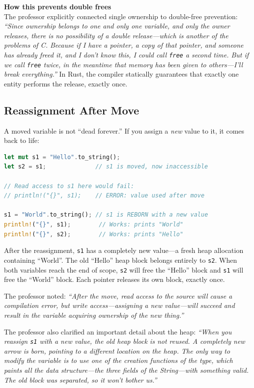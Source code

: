 \begin{insightbox}
\textbf{How this prevents double frees} \\
The professor explicitly connected single ownership to double-free prevention: \emph{``Since ownership belongs to one and only one variable, and only the owner releases, there is no possibility of a double release---which is another of the problems of C. Because if I have a pointer, a copy of that pointer, and someone has already freed it, and I don't know this, I could call \texttt{free} a second time. But if we call \texttt{free} twice, in the meantime that memory has been given to others---I'll break everything.''} In Rust, the compiler statically guarantees that exactly one entity performs the release, exactly once.
\end{insightbox}

\subsection{Reassignment After Move}

A moved variable is not ``dead forever.'' If you assign a \emph{new} value to it, it comes back to life:

\begin{lstlisting}[language=Rust]
let mut s1 = "Hello".to_string();
let s2 = s1;              // s1 is moved, now inaccessible

// Read access to s1 here would fail:
// println!("{}", s1);    // ERROR: value used after move

s1 = "World".to_string(); // s1 is REBORN with a new value
println!("{}", s1);        // Works: prints "World"
println!("{}", s2);        // Works: prints "Hello"
\end{lstlisting}

After the reassignment, \texttt{s1} has a completely new value---a fresh heap allocation containing ``World''. The old ``Hello'' heap block belongs entirely to \texttt{s2}. When both variables reach the end of scope, \texttt{s2} will free the ``Hello'' block and \texttt{s1} will free the ``World'' block. Each pointer releases its own block, exactly once.

The professor noted: \emph{``After the move, read access to the source will cause a compilation error, but write access---assigning a new value---will succeed and result in the variable acquiring ownership of the new thing.''}

The professor also clarified an important detail about the heap: \emph{``When you reassign \texttt{s1} with a new value, the old heap block is not reused. A completely new arrow is born, pointing to a different location on the heap. The only way to modify the variable is to use one of the creation functions of the type, which paints all the data structure---the three fields of the String---with something valid. The old block was separated, so it won't bother us.''}

